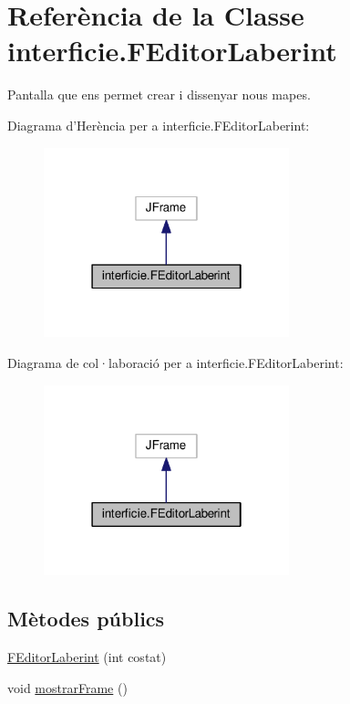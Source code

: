 \hypertarget{classinterficie_1_1_f_editor_laberint}{\section{Referència de la Classe interficie.\+F\+Editor\+Laberint}
\label{classinterficie_1_1_f_editor_laberint}
}


Pantalla que ens permet crear i dissenyar nous mapes.  




Diagrama d'Herència per a interficie.\+F\+Editor\+Laberint\+:\nopagebreak
\begin{figure}[H]
\begin{center}
\leavevmode
\includegraphics[width=202pt]{classinterficie_1_1_f_editor_laberint__inherit__graph}
\end{center}
\end{figure}


Diagrama de col·laboració per a interficie.\+F\+Editor\+Laberint\+:\nopagebreak
\begin{figure}[H]
\begin{center}
\leavevmode
\includegraphics[width=202pt]{classinterficie_1_1_f_editor_laberint__coll__graph}
\end{center}
\end{figure}
\subsection*{Mètodes públics}
\begin{DoxyCompactItemize}
\item 
\hyperlink{classinterficie_1_1_f_editor_laberint_a1a43698ec96d8c97972115436bdfecea}{F\+Editor\+Laberint} (int costat)
\item 
void \hyperlink{classinterficie_1_1_f_editor_laberint_a086984e576ea2a896cd286d6b5a0b2b7}{mostrar\+Frame} ()
\end{DoxyCompactItemize}


